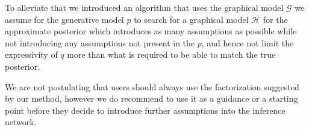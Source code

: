 \documentclass[12pt]{article}
\begin{document}
To alleviate that we introduced an algorithm that uses the graphical model $\mathcal{G}$ we assume for the generative model $p$ to search for a graphical model $\mathcal{H}$ for the approximate posterior which introduces as many assumptions as possible while not introducing any assumptions not present in the $p$, and hence not limit the expressivity of $q$ more than what is required to be able to match the true posterior.

We are not postulating that users should always use the factorization suggested by our method,
however we do recommend to use it as a guidance or a starting point before they decide to
introduce further assumptions into the inference network.



\end{document}
